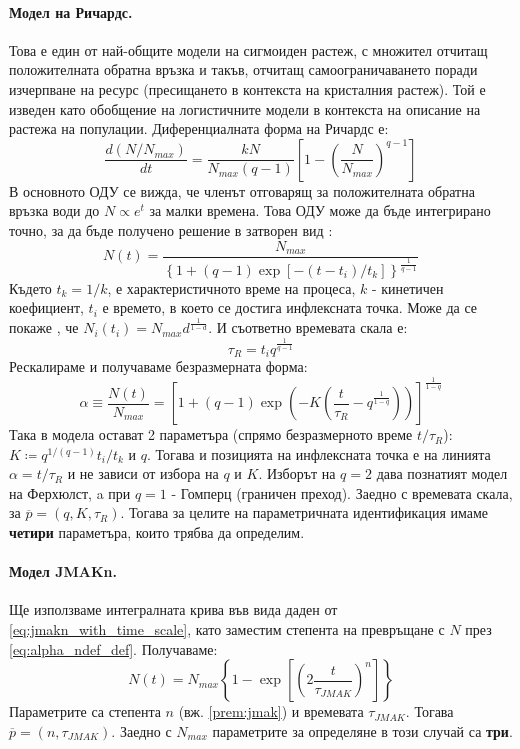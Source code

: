 \paragraph{Модел на Ричардс.} Това е един от най-общите модели на сигмоиден растеж, с множител отчитащ положителната обратна връзка и такъв, отчитащ самоограничаването поради изчерпване на ресурс (пресищането в контекста на кристалния растеж). Той е изведен като обобщение на логистичните модели в контекста на описание на растежа на популации. Диференциалната форма на Ричардс е:
\begin{equation}
    \label{eq:richards_diff_form}
    \frac{d(N/N_{max})}{dt} = \frac{k N}{N_{max}(q-1)}\left[ 1 - \left(\frac{N}{N_{max}}\right)^{q-1} \right]
\end{equation}
В основното ОДУ се вижда, че членът отговарящ за положителната обратна връзка води до $N \propto e^t$ за малки времена. Това ОДУ може да бъде интегрирано точно, за да бъде получено решение в затворен вид \cite{Richards1959}:
\begin{equation}
    \label{eq:richards_int_form}
    N(t) = \frac{N_{max}}{\left\{1 + (q-1)\exp{\left[ - (t-t_{i})/t_k \right]}\right\}^{\frac{1}{q-1}}}
\end{equation}
Където $t_k = 1/k$, е характеристичното време на процеса, $k$ - кинетичен коефициент, $t_{i}$ е времето, в което се достига инфлексната точка. Може да се покаже \cite{Tjrve2010}, че $N_i (t_i) = N_{max} d ^ {\frac{1}{1-d}}$. И съответно времевата скала е:
\begin{equation*}
    \tau_R = t_i q ^ {\frac{1}{q-1}}
\end{equation*}
Рескалираме и получаваме безразмерната форма:
\begin{equation*}
    \alpha \equiv \frac{N(t)}{N_{max}} = \left[ 1 + (q-1) \exp{\left( -K \left( \frac{t}{\tau_R} - q ^ {\frac{1}{1-q}} \right) \right)} \right] ^ {\frac{1}{1-q}}
\end{equation*}
Така в модела остават 2 параметъра (спрямо безразмерното време $t/\tau_R$): $K \coloneqq q^{1/(q-1)} t_i / t_k$ и $q$. Тогава и позицията на инфлексната точка е на линията $\alpha = t/\tau_R$ и не зависи от избора на $q$ и $K$.
Изборът на $q = 2$ дава познатият модел на Ферхюлст, a при $q = 1$ - Гомперц (граничен преход). Заедно с времевата скала, за
$\overline{p} = (q, K, \tau_R)$. Тогава за целите на параметричната идентификация имаме \textbf{четири} параметъра, които трябва да определим.

\paragraph{Модел JMAKn.} Ще използваме интегралната крива във вида даден от \autoref{eq:jmakn_with_time_scale}, като заместим степента на превръщане с $N$ през \autoref{eq:alpha_ndef_def}. Получаваме:
\begin{equation}
    \label{eq:jmakn_intform_n}
    N(t) = N_{max} \left\{ 1 - \exp{\left[  \left( 2 \frac{t}{\tau_{JMAK}} \right)^n \right]} \right\}
\end{equation}
Параметрите са степента $n$ (вж. \autoref{prem:jmak}) и времевата $\tau_{JMAK}$. Тогава $\overline{p} = (n, \tau_{JMAK})$. Заедно с $N_{max}$ параметрите за определяне в този случай са \textbf{три}.

